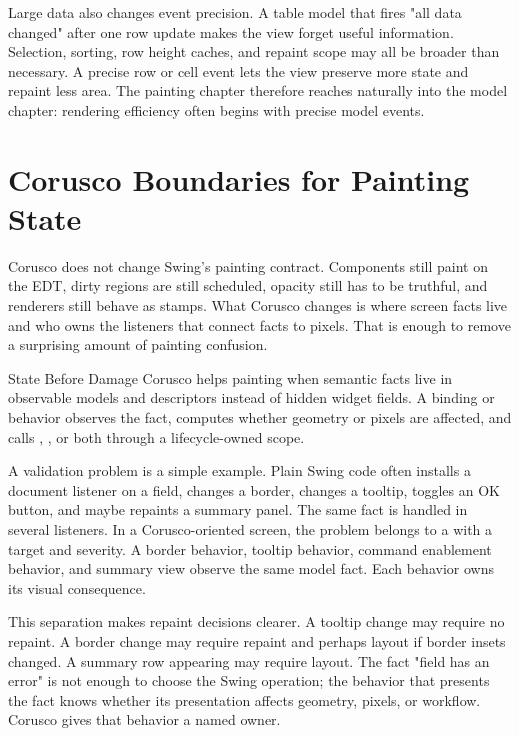 Large data also changes event precision. A table model that fires "all data changed" after one row update makes the view forget useful information. Selection, sorting, row height caches, and repaint scope may all be broader than necessary. A precise row or cell event lets the view preserve more state and repaint less area. The painting chapter therefore reaches naturally into the model chapter: rendering efficiency often begins with precise model events.

\section{Corusco Boundaries for Painting State}

Corusco does not change Swing's painting contract. Components still paint on the EDT, dirty regions are still scheduled, opacity still has to be truthful, and renderers still behave as stamps. What Corusco changes is where screen facts live and who owns the listeners that connect facts to pixels. That is enough to remove a surprising amount of painting confusion.

\begin{coruscobox}{State Before Damage}
Corusco helps painting when semantic facts live in observable models and descriptors instead of hidden widget fields. A binding or behavior observes the fact, computes whether geometry or pixels are affected, and calls , , or both through a lifecycle-owned scope.
\end{coruscobox}

A validation problem is a simple example. Plain Swing code often installs a document listener on a field, changes a border, changes a tooltip, toggles an OK button, and maybe repaints a summary panel. The same fact is handled in several listeners. In a Corusco-oriented screen, the problem belongs to a  with a target and severity. A border behavior, tooltip behavior, command enablement behavior, and summary view observe the same model fact. Each behavior owns its visual consequence.

This separation makes repaint decisions clearer. A tooltip change may require no repaint. A border change may require repaint and perhaps layout if border insets changed. A summary row appearing may require layout. The fact "field has an error" is not enough to choose the Swing operation; the behavior that presents the fact knows whether its presentation affects geometry, pixels, or workflow. Corusco gives that behavior a named owner.


